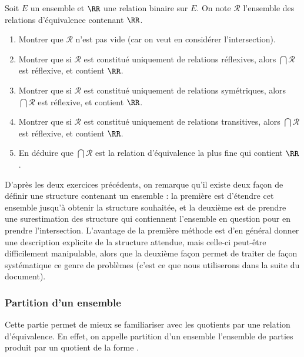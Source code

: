 \begin{exo}
    Soit $E$ un ensemble et $\RR$ une relation binaire sur $E$. On note $\boldsymbol{\mathcal R}$ l'ensemble des relations d'équivalence contenant $\RR$.
    \begin{enumerate}
        \item Montrer que $\boldsymbol{\mathcal R}$ n'est pas vide (car on veut en considérer l'intersection).
        \item Montrer que si $\boldsymbol{\mathcal R}$ est constitué uniquement de relations réflexives, alors $\displaystyle{\bigcap\boldsymbol{\mathcal R}}$ est réflexive, et contient $\RR$.
        \item Montrer que si $\boldsymbol{\mathcal R}$ est constitué uniquement de relations symétriques, alors $\displaystyle{\bigcap\boldsymbol{\mathcal R}}$ est réflexive, et contient $\RR$.
        \item Montrer que si $\boldsymbol{\mathcal R}$ est constitué uniquement de relations transitives, alors $\displaystyle{\bigcap\boldsymbol{\mathcal R}}$ est réflexive, et contient $\RR$.
        \item En déduire que $\displaystyle{\bigcap\boldsymbol{\mathcal R}}$ est la relation d'équivalence la plus fine qui contient $\RR$.
    \end{enumerate}
\end{exo}

\begin{rmk}
    D'après les deux exercices précédents, on remarque qu'il existe deux façon de définir une structure contenant un ensemble : la première est d'étendre cet ensemble jusqu'à obtenir la structure souhaitée, et la deuxième est de prendre une surestimation des structure qui contiennent l'ensemble en question pour en prendre l'intersection. L'avantage de la première méthode est d'en général donner une description explicite de la structure attendue, mais celle-ci peut-être difficilement manipulable, alors que la deuxième façon permet de traiter de façon systématique ce genre de problèmes (c'est ce que nous utiliserons dans la suite du document).
\end{rmk}

\subsubsection{Partition d'un ensemble}

Cette partie permet de mieux se familiariser avec les quotients par une relation d'équivalence. En effet, on appelle partition d'un ensemble l'ensemble de parties produit par un quotient de la forme .

